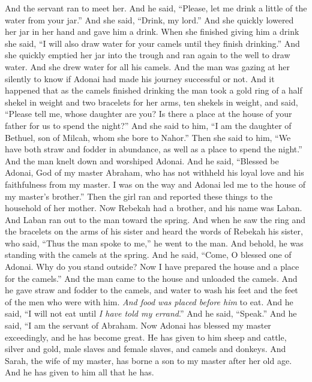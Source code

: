 \begin{biblechapter}
\verse And the servant ran to meet her. And he said, “Please, let me drink a little of the water from your jar.”
\verse And she said, “Drink, my lord.” And she quickly lowered her jar in her hand and gave him a drink.
\verse When she finished giving him a drink she said, “I will also draw water for your camels until they finish drinking.”
\verse And she quickly emptied her jar into the trough and ran again to the well to draw water. And she drew water for all his camels.
\verse And the man was gazing at her silently to know if Adonai had made his journey successful or not.
\verse And it happened that as the camels finished drinking the man took a gold ring of a half shekel in weight and two bracelets for her arms, ten shekels in weight,
\verse and said, “Please tell me, whose daughter are you? Is there a place at the house of your father for us to spend the night?”
\verse And she said to him, “I am the daughter of Bethuel, son of Milcah, whom she bore to Nahor.”
\verse Then she said to him, “We have both straw and fodder in abundance, as well as a place to spend the night.”
\verse And the man knelt down and worshiped Adonai.
\verse And he said, “Blessed be Adonai, God of my master Abraham, who has not withheld his loyal love and his faithfulness from my master. I was on the way and Adonai led me to the house of my master’s brother.”
\verse Then the girl ran and reported these things to the household of her mother.
\verse Now Rebekah had a brother, and his name was Laban. And Laban ran out to the man toward the spring.
\verse And when he saw the ring and the bracelets on the arms of his sister and heard the words of Rebekah his sister, who said, “Thus the man spoke to me,” he went to the man. And behold, he was standing with the camels at the spring.
\verse And he said, “Come, O blessed one of Adonai. Why do you stand outside? Now I have prepared the house and a place for the camels.”
\verse And the man came to the house and unloaded the camels. And he gave straw and fodder to the camels, and water to wash his feet and the feet of the men who were with him.
\verse \textit{And food was placed before him} to eat. And he said, “I will not eat until \textit{I have told my errand}.” And he said, “Speak.”
\verse And he said, “I am the servant of Abraham.
\verse Now Adonai has blessed my master exceedingly, and he has become great. He has given to him sheep and cattle, silver and gold, male slaves and female slaves, and camels and donkeys.
\verse And Sarah, the wife of my master, has borne a son to my master after her old age. And he has given to him all that he has.

\end{biblechapter}
